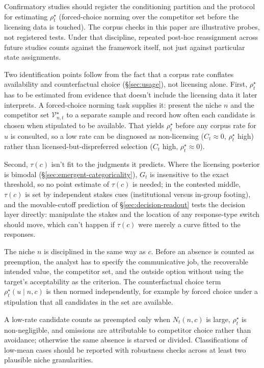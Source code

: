 Confirmatory studies should register the conditioning partition and the protocol
for estimating $\rho_t^\star$ (\eg forced-choice norming over the competitor set
before the licensing data is touched). The corpus checks in this paper are
illustrative probes, not registered tests. Under that discipline, repeated
post-hoc reassignment across future studies counts against the framework itself,
not just against particular state assignments.

Two identification points follow from the fact that a corpus rate conflates
availability and counterfactual choice (\S\ref{sec:usage}), not licensing alone.
First, $\rho_t^\star$ has to be estimated from evidence that
doesn't include the licensing data it later interprets. A forced-choice norming
task supplies it: present the niche $n$ and the competitor set
$\mathcal{V}_{n,t}^{\star}$ to a separate sample and record how often each
candidate is chosen when stipulated to be available. That yields $\rho_t^\star$
before any corpus rate for $u$ is consulted, so a low rate can be diagnosed as
non-licensing ($C_t\!\approx\!0$, $\rho_t^\star$ high) rather than
licensed-but-dispreferred selection ($C_t$ high, $\rho_t^\star\!\approx\!0$).

Second, $\tau(c)$ isn't fit to the judgments it predicts. Where the licensing
posterior is bimodal (\S\ref{sec:emergent-categoricality}), $G_t$ is insensitive
to the exact threshold, so no point estimate of $\tau(c)$ is needed; in the
contested middle, $\tau(c)$ is set by independent stakes cues (institutional
versus in-group footing), and the movable-cutoff prediction of
\S\ref{sec:decision-readout} tests the decision layer directly: manipulate the
stakes and the location of any response-type switch should move, which can't
happen if $\tau(c)$ were merely a curve fitted to the responses.

The niche $n$ is disciplined in the same way as $c$. Before an absence is counted
as preemption, the analyst has to specify the communicative job, the recoverable
intended value, the competitor set, and the outside option without using the
target's acceptability as the criterion. The counterfactual choice term
$\rho_t^\star(u\mid n,c)$ is then normed independently, for example by forced
choice under a stipulation that all candidates in the set are available.

A low-rate candidate counts as preempted only when $N_t(n,c)$ is large,
$\rho_t^\star$ is non-negligible, and omissions are attributable to competitor
choice rather than avoidance; otherwise the same absence is starved or divided.
Classifications of low-mean cases should be reported with robustness checks
across at least two plausible niche granularities.

